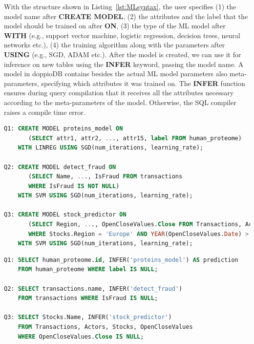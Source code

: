 \documentclass[11pt,dvipdfm]{article}
\begin{document}
With the structure shown in Listing~\ref{lst:MLsyntax}, the user specifies (1) the model name after \textbf{CREATE MODEL}, (2) the attributes and the label that the model should be trained on after \textbf{ON}, (3) the type of the ML model after \textbf{WITH} (e.g., support vector machine, logistic regression, decision trees, neural networks etc.), (4) the training algorithm along with the parameters after \textbf{USING} (e.g., SGD, ADAM etc.). After the model is created, we can use it for inference on new tables using the \textbf{INFER} keyword, passing the model name. A model in doppioDB contains besides the actual ML model parameters also meta-parameters, specifying which attributes it was trained on. The \textbf{INFER} function ensures during query compilation that it receives all the attributes necessary according to the meta-parameters of the model. Otherwise, the SQL compiler raises a compile time error.

\begin{lstlisting}[float=tp,frame=single,breaklines=true,language=sql,keywords={SELECT,FROM,CREATE,MODEL,ON,USING,WITH,OVER,WHERE},caption=Queries to train various models on any desired projection using SGD. ,basicstyle=\small,label={lst:sgdquery}]
Q1: CREATE MODEL proteins_model ON 
       (SELECT attr1, attr2, ..., attr15, label FROM human_proteome)
    WITH LINREG USING SGD(num_iterations, learning_rate);

Q2: CREATE MODEL detect_fraud ON
       (SELECT Name, ..., IsFraud FROM transactions
       WHERE IsFraud IS NOT NULL)
    WITH SVM USING SGD(num_iterations, learning_rate);

Q3: CREATE MODEL stock_predictor ON
       (SELECT Region, ..., OpenCloseValues.Close FROM Transactions, Actors, Stocks, OpenCloseValues
       WHERE Stocks.Region = 'Europe' AND YEAR(OpenCloseValues.Date) > 2010 AND Actors.Position = 'Manager')
    WITH SVM USING SGD(num_iterations, learning_rate);
\end{lstlisting}

\begin{lstlisting}[float=tp,frame=single,breaklines=true,language=sql,keywords={SELECT,FROM,INFER,ON,WHERE,AS},caption=Inference queries to make predictions on tuples with empty labels.,basicstyle=\small,label={lst:inferquery}]
Q1: SELECT human_proteome.id, INFER('proteins_model') AS prediction 
    FROM human_proteome WHERE label IS NULL;

Q2: SELECT transactions.name, INFER('detect_fraud') 
    FROM transactions WHERE IsFraud IS NULL;

Q3: SELECT Stocks.Name, INFER('stock_predictor')
    FROM Transactions, Actors, Stocks, OpenCloseValues
    WHERE OpenCloseValues.Close IS NULL;
\end{lstlisting}
\end{document}
